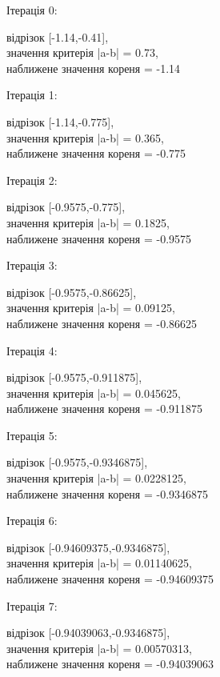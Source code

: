 \documentclass[a4paper,14pt]{extarticle} %
\begin{document}
Ітерація 0: \parbox[t]{12cm}{ відрізок [-1.14,-0.41], \\
            значення критерія |a-b| = 0.73, \\ 
            наближене значення кореня = -1.14 \\ } \par
Ітерація 1: \parbox[t]{12cm}{ відрізок [-1.14,-0.775], \\
            значення критерія |a-b| = 0.365, \\ 
            наближене значення кореня = -0.775 \\ } \par
Ітерація 2: \parbox[t]{12cm}{ відрізок [-0.9575,-0.775], \\
            значення критерія |a-b| = 0.1825, \\ 
            наближене значення кореня = -0.9575 \\ } \par
Ітерація 3: \parbox[t]{12cm}{ відрізок [-0.9575,-0.86625], \\
            значення критерія |a-b| = 0.09125, \\ 
            наближене значення кореня = -0.86625 \\ } \par
Ітерація 4: \parbox[t]{12cm}{ відрізок [-0.9575,-0.911875], \\
            значення критерія |a-b| = 0.045625, \\ 
            наближене значення кореня = -0.911875 \\ } \par
Ітерація 5: \parbox[t]{12cm}{ відрізок [-0.9575,-0.9346875], \\
            значення критерія |a-b| = 0.0228125, \\ 
            наближене значення кореня = -0.9346875 \\ } \par
Ітерація 6: \parbox[t]{12cm}{ відрізок [-0.94609375,-0.9346875], \\
            значення критерія |a-b| = 0.01140625, \\ 
            наближене значення кореня = -0.94609375 \\ } \par
Ітерація 7: \parbox[t]{12cm}{ відрізок [-0.94039063,-0.9346875], \\
            значення критерія |a-b| = 0.00570313, \\ 
            наближене значення кореня = -0.94039063 \\ } \par
\end{document}
